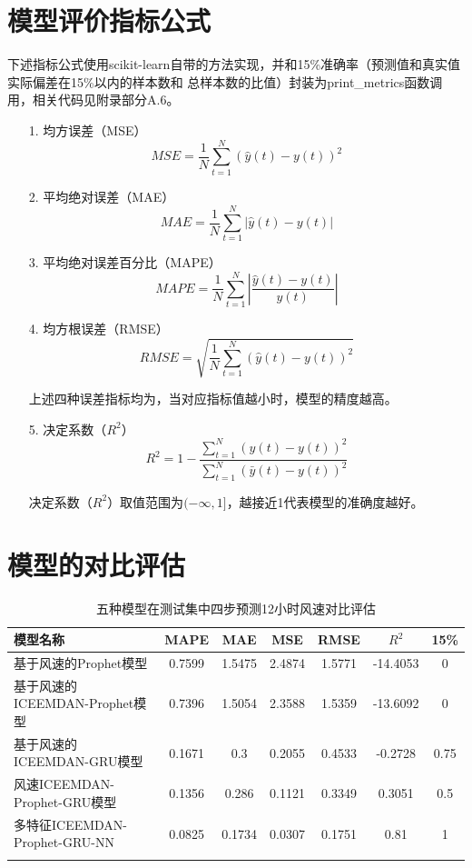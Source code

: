 \documentclass[AutoFakeBold]{LZUThesis}
\begin{document}
\section{模型评价指标公式}
下述指标公式使用scikit-learn自带的方法实现，并和15\%准确率（预测值和真实值实际偏差在15\%以内的样本数和
总样本数的比值）封装为print\_metrics函数调用，相关代码见附录部分A.6。
\begin{itemize}
\item[1. ] 均方误差（MSE）
$$MSE=\frac{1}{N}\sum_{t=1}^{N}\left(\hat{y}\left(t\right)-y\left(t\right)\right)^2$$

\item[2. ] 平均绝对误差（MAE）
$$MAE=\frac{1}{N}\sum_{t=1}^{N}\left|\hat{y}\left(t\right)-y\left(t\right)\right|$$

\item[3. ] 平均绝对误差百分比（MAPE）
$$MAPE=\frac{1}{N}\sum_{t=1}^{N}\left|\frac{\hat{y}\left(t\right)-y\left(t\right)}{y\left(t\right)}\right|$$

\item[4. ] 均方根误差（RMSE）
$$RMSE=\sqrt{\frac{1}{N}\sum_{t=1}^{N}\left(\hat{y}\left(t\right)-y\left(t\right)\right)^2}$$

上述四种误差指标均为，当对应指标值越小时，模型的精度越高。

\item[5. ] 决定系数（$R^2$）
$$R^2=1-\frac{\sum_{t=1}^{N}(\hat{y}\left(t\right)-y\left(t\right))^2}{\sum_{t=1}^{N}(\bar{y}\left(t\right)-y\left(t\right))^2}$$

决定系数（$R^2$）取值范围为$(-\infty, 1]$，越接近1代表模型的准确度越好。
\end{itemize}

\section{模型的对比评估}

\begin{table}[H]
    \centering
    \caption{五种模型在测试集中四步预测12小时风速对比评估}
    \begin{tabular}{lcccccc}
    \toprule
    模型名称 & MAPE & MAE & MSE & RMSE & $R^2$ & 15\% \\
    \midrule
    基于风速的Prophet模型 & 0.7599 & 1.5475 & 2.4874 & 1.5771 & -14.4053 & 0 \\
    基于风速的ICEEMDAN-Prophet模型 & 0.7396 & 1.5054 & 2.3588 & 1.5359 & -13.6092 & 0 \\
    基于风速的ICEEMDAN-GRU模型 & 0.1671 & 0.3 & 0.2055 & 0.4533 & -0.2728 & 0.75 \\
    风速ICEEMDAN-Prophet-GRU模型 & 0.1356 & 0.286 & 0.1121 & 0.3349 & 0.3051 & 0.5 \\
    多特征ICEEMDAN-Prophet-GRU-NN & 0.0825 & 0.1734 & 0.0307 & 0.1751 & 0.81 & 1 \\
    \bottomrule \\
    \end{tabular} \\
    \label{models-metrics}
\end{table}
\end{document}
